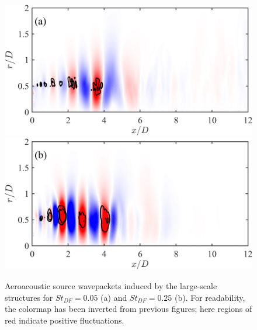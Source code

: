 \begin{figure}
	\centering
		\includegraphics[width=0.65\linewidth]{Figures/ch5_St005_SL_131_v2.png}\\
		\includegraphics[width=0.65\linewidth]{Figures/ch5_St025_SL_1_v2.png}
	\caption{Aeroacoustic source wavepackets induced by the large-scale structures for $St_{DF} = 0.05$ (a) and $St_{DF} = 0.25$ (b). For readability, the colormap has been inverted from previous figures; here regions of red indicate positive fluctuations.}
	\label{fig:SL}
\end{figure}


